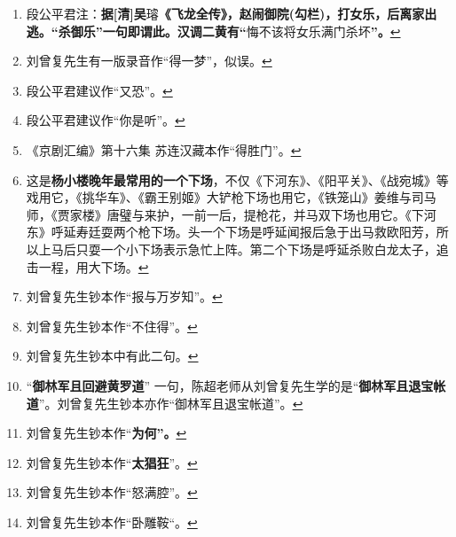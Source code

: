 \begin{enumerate}
\item
  \leavevmode\hypertarget{fn422}{}%
  段公平君注：\textbf{据{[}清{]}吴}璿\textbf{《飞龙全传》，赵闹御院(勾栏)，打女乐，后离家出逃。``杀御乐''一句即谓此。汉调二黄有``}悔不该将女乐满门杀坏\textbf{''。}\protect\hyperlink{fnref422}{↩}
\item
  \leavevmode\hypertarget{fn423}{}%
  刘曾复先生有一版录音作``得一梦''，似误。\protect\hyperlink{fnref423}{↩}
\item
  \leavevmode\hypertarget{fn424}{}%
  段公平君建议作``又恐''。\protect\hyperlink{fnref424}{↩}
\item
  \leavevmode\hypertarget{fn425}{}%
  段公平君建议作``你是听''。\protect\hyperlink{fnref425}{↩}
\item
  \leavevmode\hypertarget{fn426}{}%
  《京剧汇编》第十六集
  苏连汉藏本作``得胜门''。\protect\hyperlink{fnref426}{↩}
\item
  \leavevmode\hypertarget{fn427}{}%
  这是\textbf{杨小楼晚年最常用的一个下场}，不仅《下河东》、《阳平关》、《战宛城》等戏用它，《挑华车》、《霸王别姬》大铲枪下场也用它，《铁笼山》姜维与司马师，《贾家楼》唐璧与来护，一前一后，提枪花，并马双下场也用它。《下河东》呼延寿廷耍两个枪下场。头一个下场是呼延闻报后急于出马救欧阳芳，所以上马后只耍一个小下场表示急忙上阵。第二个下场是呼延杀败白龙太子，追击一程，用大下场。\protect\hyperlink{fnref427}{↩}
\item
  \leavevmode\hypertarget{fn428}{}%
  刘曾复先生钞本作``报与万岁知''。\protect\hyperlink{fnref428}{↩}
\item
  \leavevmode\hypertarget{fn429}{}%
  刘曾复先生钞本作``不住得''。\protect\hyperlink{fnref429}{↩}
\item
  \leavevmode\hypertarget{fn430}{}%
  刘曾复先生钞本中有此二句。\protect\hyperlink{fnref430}{↩}
\item
  \leavevmode\hypertarget{fn431}{}%
  ``\textbf{御林军且回避黄罗道}''
  一句，陈超老师从刘曾复先生学的是``\textbf{御林军且退宝帐道}''。刘曾复先生钞本亦作``御林军且退宝帐道''。\protect\hyperlink{fnref431}{↩}
\item
  \leavevmode\hypertarget{fn432}{}%
  刘曾复先生钞本作``\textbf{为何''。}\protect\hyperlink{fnref432}{↩}
\item
  \leavevmode\hypertarget{fn433}{}%
  刘曾复先生钞本作``\textbf{太猖狂}''。\protect\hyperlink{fnref433}{↩}
\item
  \leavevmode\hypertarget{fn434}{}%
  刘曾复先生钞本作``怒满腔''。\protect\hyperlink{fnref434}{↩}
\item
  \leavevmode\hypertarget{fn435}{}%
  刘曾复先生钞本作``卧雕鞍``。\protect\hyperlink{fnref435}{↩}

\end{enumerate}
